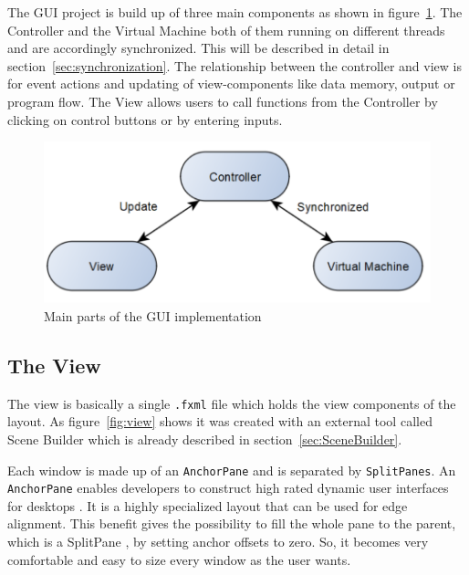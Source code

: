 The GUI project is build up of three main components as shown in figure~\ref{fig:partsOfGui}. The Controller and the Virtual Machine both of them  running on different threads and are accordingly synchronized. This will be described in detail in section~\ref{sec:synchronization}. The relationship between the controller and view is for event actions and updating of view-components like data memory, output or program flow. The View allows users to call functions from the Controller by clicking on control buttons or by entering inputs. 
\begin{figure}[h] 
	\centering
	\includegraphics[scale=.70]{images/modelOfGui.png}
	\caption{Main parts of the GUI implementation}
	\label{fig:partsOfGui}
\end{figure}
\subsection{The View}\label{sec:TreeView}
The view is basically a single \lstinline$.fxml$ file which holds the view components of the layout. As figure~\ref{fig:view} shows it was created with an external tool called Scene Builder which is already described in section~\ref{sec:SceneBuilder}.

Each window is made up of an \lstinline$AnchorPane$ and is separated by \lstinline$SplitPanes$. An \lstinline$AnchorPane$ enables developers to construct high rated dynamic user interfaces for desktops . It is a highly specialized layout that can be used for edge alignment. This benefit gives the possibility to fill the whole pane to the parent, which is a SplitPane , by setting anchor offsets to zero. So, it becomes very comfortable and easy to size every window as the user wants.

